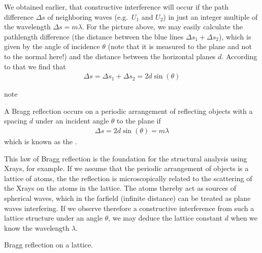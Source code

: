 \documentclass[letterpaper,10pt,english]{sphinxmanual}
\begin{document}
We obtained earlier, that constructive interference will occur if the path difference \(\Delta s\) of neighboring waves (e.g. \(U_1\) and \(U_2\)) in just an integer multiple of the wavelength \(\Delta s=m\lambda\). For the picture above, we may easily calculate the pathlength difference (the distance between the blue lines \(\Delta s_1+\Delta s_2\)), which is given by the angle of incidence \(\theta\) (note that it is measured to the plane and not to the normal here!)
and the distance between the horizontal planes \(d\). According to that we find that
\begin{equation*}
\begin{split}\Delta s=\Delta s_1+\Delta s_2 =2 d\sin(\theta)\end{split}
\end{equation*}
\begin{sphinxadmonition}{note}{}\unskip
{}

A Bragg reflection occurs on a periodic arrangement of reflecting objects with a spacing \(d\) under an incident angle \(\theta\) to the plane if
\begin{equation*}
\begin{split}\Delta s=2 d\sin(\theta)=m\lambda\end{split}
\end{equation*}
which is known as the .
\end{sphinxadmonition}

This law of Bragg reflection is the foundation for the structural analysis using X\sphinxhyphen{}rays, for example. If we assume that the periodic arrangement of objects is a lattice of atoms, the the reflection is microscopically related to the scattering of the X\sphinxhyphen{}rays on the atoms in the lattice. The atoms thereby act as sources of spherical waves, which in the far\sphinxhyphen{}field (infinite distance) can be treated as plane waves interfering. If we observe therefore a constructive interference from such a lattice
structure under an angle \(\theta\), we may deduce the lattice constant \(d\) when we know the wavelength \(\lambda\).






 Bragg reflection on a lattice.
\end{document}

